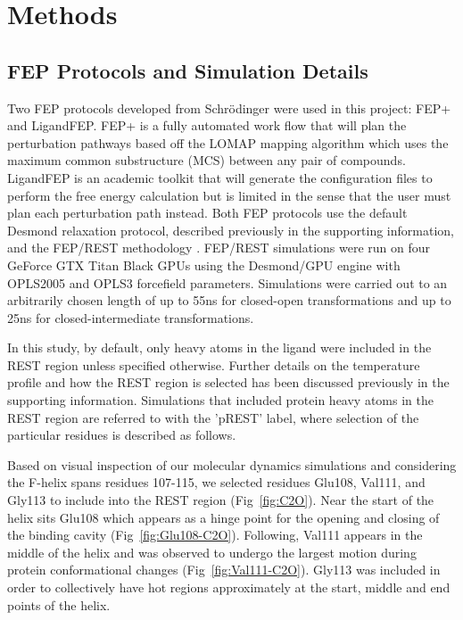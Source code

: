 \documentclass[journal=jctcce,manuscript=article]{achemso}
\begin{document}
\section{Methods}
\subsection*{FEP Protocols and Simulation Details}
Two FEP protocols developed from Schr\"{o}dinger were used in this project: FEP+\cite{FEPplus} and LigandFEP\cite{LigandFEP}.
FEP+ is a fully automated work flow that will plan the perturbation pathways based off the LOMAP \cite{LOMAP} mapping algorithm which uses the maximum common substructure (MCS) between any pair of compounds.
LigandFEP is an academic toolkit that will generate the configuration files to perform the free energy calculation but is limited in the sense that the user must plan each perturbation path instead.
Both FEP protocols use the default Desmond relaxation protocol, described previously \cite{FEPplus} in the supporting information, and the FEP/REST methodology \cite{REST,REST2,FEP/REST,FEP/RESTapp}.
FEP/REST simulations were run on four GeForce GTX Titan Black GPUs using the Desmond/GPU engine \cite{DESMONDSoftware,DESMONDPaper1,DESMONDPaper2} with OPLS2005 \cite{OPLS2005} and OPLS3 \cite{OPLS3} forcefield parameters.
Simulations were carried out to an arbitrarily chosen length of up to 55ns for closed-open transformations and up to 25ns for closed-intermediate transformations.

In this study, by default, only heavy atoms in the ligand were included in the REST region unless specified otherwise.
Further details on the temperature profile and how the REST region is selected has been discussed previously\cite{FEP/REST,FEPplus} in the supporting information.
Simulations that included protein heavy atoms in the REST region are referred to with the 'pREST' label, where selection of the particular residues is described as follows.

Based on visual inspection of our molecular dynamics simulations and considering the F-helix spans residues 107-115, we selected residues Glu108, Val111, and Gly113 to include into the REST region (Fig~\ref{fig:C2O}).
Near the start of the helix sits Glu108 which appears as a hinge point for the opening and closing of the binding cavity (Fig~\ref{fig:Glu108-C2O}).
Following, Val111 appears in the middle of the helix and was observed to undergo the largest motion during protein conformational changes (Fig~\ref{fig:Val111-C2O}).
Gly113 was included in order to collectively have hot regions approximately at the start, middle and end points of the helix.
\end{document}
